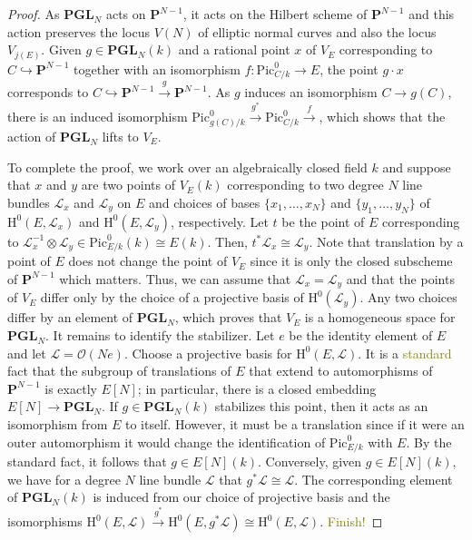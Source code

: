 \documentclass[10pt,letterpaper,twoside]{article}
\newcommand{\BA}[1]{\textcolor{olive}{#1}}
\newcommand{\Lscr}{\mathcal{L}}
\newcommand{\Oscr}{\mathcal{O}}
\renewcommand{\H}{\mathrm{H}}
\renewcommand{\1}{\mathbf{1}}
\newcommand{\bP}{\mathbf{P}}
\newcommand{\PGL}{\mathbf{PGL}}
\newcommand{\Pic}{\mathrm{Pic}}
\newcommand{\iso}{\cong}
\theoremstyle{plain}
\theoremstyle{plain}
\theoremstyle{definition}
\theoremstyle{named}
\theoremstyle{definition}
\begin{document}
\begin{proof}
    As $\PGL_N$ acts on $\bP^{N-1}$, it acts on the Hilbert scheme of $\bP^{N-1}$ and this action
    preserves the locus $V(N)$ of elliptic normal curves and also the locus $V_{j(E)}$.
    Given $g\in\PGL_N(k)$ and a rational point $x$ of $V_E$ corresponding to $C\hookrightarrow\bP^{N-1}$
    together with an isomorphism $f\colon\Pic^0_{C/k}\rightarrow E$, the point $g\cdot x$
    corresponds to $C\hookrightarrow\bP^{N-1}\xrightarrow{g}\bP^{N-1}$. As $g$ induces an isomorphism
    $C\rightarrow g(C)$, there is an induced isomorphism
    $\Pic^0_{g(C)/k}\xrightarrow{g^*}\Pic^0_{C/k}\xrightarrow{f}$, which shows that the action of
    $\PGL_N$ lifts to $V_E$.

    To complete the proof, we work over an algebraically closed field $k$ and suppose that $x$ and $y$
    are two points of $V_E(k)$ corresponding to two degree $N$ line bundles $\Lscr_x$ and
    $\Lscr_y$ on $E$ and choices of bases $\{x_1,\ldots,x_N\}$ and $\{y_1,\ldots,y_N\}$ of
    $\H^0(E,\Lscr_x)$ and $\H^0(E,\Lscr_y)$, respectively. Let $t$ be the point of $E$
    corresponding to $\Lscr_x^{-1}\otimes\Lscr_y\in\Pic^0_{E/k}(k)\iso E(k)$. Then,
    $t^*\Lscr_x\iso\Lscr_y$. Note that translation by a point of $E$ does not change the point of
    $V_E$ since it is only the closed subscheme of $\bP^{N-1}$ which matters. Thus, we can assume
    that $\Lscr_x=\Lscr_y$ and that the points of $V_E$ differ only by the choice of a projective basis of
    $\H^0(\Lscr_y)$. Any two choices differ by an element of $\PGL_N$, which proves that $V_E$ is a
    homogeneous space for $\PGL_N$. It remains to identify the stabilizer. Let $e$ be the identity
    element of $E$ and let $\Lscr=\Oscr(Ne)$. Choose a projective basis for $\H^0(E,\Lscr)$. It is a \BA{standard}
    fact that the subgroup of translations of $E$ that extend to automorphisms of $\bP^{N-1}$ is
    exactly $E[N]$; in particular, there is a closed embedding $E[N]\rightarrow\PGL_N$. If
    $g\in\PGL_N(k)$ stabilizes this point, then it acts as an isomorphism from $E$ to itself.
    However, it must be a translation since if it were an outer automorphism it would change the
    identification of $\Pic^0_{E/k}$ with $E$. By the standard fact, it follows that $g\in E[N](k)$.
    Conversely, given $g\in E[N](k)$, we have for a degree $N$ line bundle $\Lscr$ that
    $g^*\Lscr\iso\Lscr$. The corresponding element of $\PGL_N(k)$ is induced from our choice of
    projective basis and the isomorphisms
    $\H^0(E,\Lscr)\xrightarrow{g^*}\H^0(E,g^*\Lscr)\iso\H^0(E,\Lscr)$. \BA{Finish!}
\end{proof}
\end{document}
